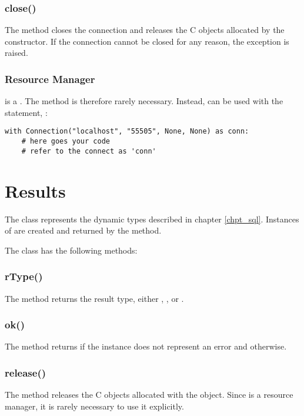 \subsubsection{close()}
The method closes the connection and
releases the C objects allocated by
the constructor. If the connection
cannot be closed for any reason,
the exception  is raised.

\subsubsection{Resource Manager}
 is a .
The method  is therefore
rarely necessary. Instead,  can
be used with the  statement, \ie:

\begin{python}
\begin{lstlisting}
with Connection("localhost", "55505", None, None) as conn:
    # here goes your code
    # refer to the connect as 'conn'
\end{lstlisting}
\end{python}

\section{Results}
The  class represents
the dynamic types described in chapter \ref{chpt_sql}.
Instances of  are
created and returned by
the  method.

The  class has the following methods:

\subsubsection{rType()}
The method returns the result type,
either , ,
 or .

\subsubsection{ok()}
The method returns 
if the instance does not represent
an error and  otherwise.

\subsubsection{release()}
The method releases the C objects
allocated with the  object.
Since  is a resource manager,
it is rarely necessary to use it explicitly.

